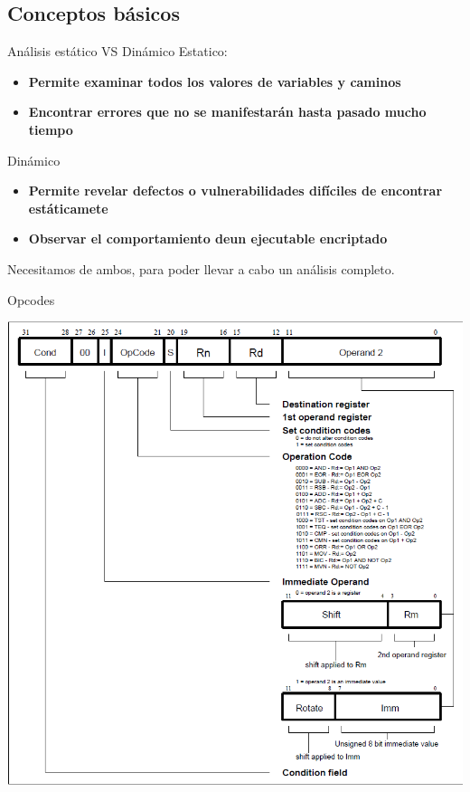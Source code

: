 \documentclass{beamer}
\begin{document}
\subsection{Conceptos básicos}

\begin{frame}{Análisis estático VS Dinámico}
Estatico:
\begin{itemize}
	\item \textbf{Permite examinar todos los valores de variables y caminos}
	\item \textbf{Encontrar errores que no se manifestarán hasta pasado mucho tiempo}
\end{itemize}
Dinámico
\begin{itemize}
	\item \textbf{Permite revelar defectos o vulnerabilidades difíciles de encontrar estáticamete}
	\item \textbf{Observar el comportamiento deun ejecutable encriptado}
\end{itemize}
Necesitamos de ambos, para poder llevar a cabo un análisis completo.


\end{frame}

\begin{frame}{Opcodes}

\begin{center}
\includegraphics[scale=0.3]{0cPOx.png}
\end{center}

\end{frame}
\end{document}
